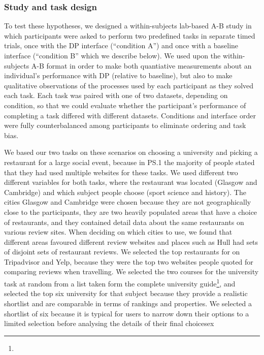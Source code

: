 \documentclass{sigchi}
\begin{document}
\subsubsection{Study and task design}
To test these hypotheses, we designed a within-subjects lab-based A-B study in which participants were asked to perform two predefined tasks in separate timed trials, once with the DP interface (``condition A'') and once with a baseline interface (``condition B'' which we describe below).  We used upon the within-subjects A-B format in order to make both quantiative measurements about an individual's performance with DP (relative to baseline), but also to make qualitative observations of the processes used by each participant as they solved each task.  Each task was paired with one of two datasets, depending on condition, so that we could evaluate whether the participant's performance of completing a task differed with different datasets.  Conditions and interface order were fully counterbalanced among participants to eliminate ordering and task bias.  

We based our two tasks on these scenarios on choosing a university and picking a restaurant for a large social event, because in PS.1 the majority of people stated that they had used multiple websites for these tasks.  We used different two different variables for both tasks, where the restaurant was located (Glasgow and Cambridge) and which subject people choose (sport science and history).  The cities Glasgow and Cambridge were chosen because they are not geographically close to the participants, they are two heavily populated areas that have a choice of restaurants, and they contained detail data about the same restaurants on various review sites.  When deciding on which cities to use, we found that different areas favoured different review websites and places such as Hull had sets of disjoint sets of restaurant reviews.  We selected the top restaurants for on Tripadvisor and Yelp, because they were the top two websites people quoted for comparing reviews when travelling.  We selected the two courses for the university task at random from a list taken form the complete university guide\footnote{}, and selected the top six university for that subject because they provide a realistic shortlist and are comparable in terms of rankings and properties.   We selected a shortlist of six because it is typical for users to narrow down their options to a limited selection before analysing the details of their final choicesex
\end{document}
